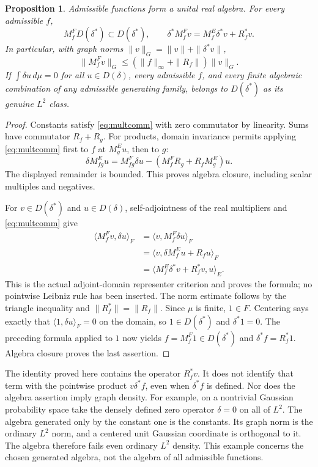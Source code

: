 \documentclass[11pt]{article}
\newtheorem{proposition}[theorem]{Proposition}
\begin{document}
\begin{proposition}\label{prop:multadjoint}
Admissible functions form a unital real algebra. For every admissible $f$,
\[
 M_f^F D(\delta^*)\subset D(\delta^*),\qquad
 \delta^*M_f^Fv=M_f^E\delta^*v+R_f^*v.
\]
In particular, with graph norms $\|v\|_G=\|v\|+\|\delta^*v\|$,
\[
 \|M_f^Fv\|_G\leq
 (\|f\|_\infty+\|R_f\|)\|v\|_G.
\]
If $\int\delta u\,d\mu=0$ for all $u\in D(\delta)$, every
admissible $f$, and every finite algebraic combination of any admissible
generating family, belongs to $D(\delta^*)$ as its genuine $L^2$ class.
\end{proposition}
\begin{proof}
Constants satisfy \eqref{eq:multcomm} with zero commutator by linearity.
Sums have commutator $R_f+R_g$. For products, domain invariance permits
applying \eqref{eq:multcomm} first to $f$ at $M_g^Eu$, then to $g$:
\[
 \delta M_{fg}^Eu=M_{fg}^F\delta u
       -(M_f^FR_g+R_fM_g^E)u.
\]
The displayed remainder is bounded. This proves algebra closure,
including scalar multiples and negatives.

For $v\in D(\delta^*)$ and $u\in D(\delta)$, self-adjointness of
the real multipliers and \eqref{eq:multcomm} give
\begin{align*}
 \langle M_f^Fv,\delta u\rangle_F
 &=\langle v,M_f^F\delta u\rangle_F\\
 &=\langle v,\delta M_f^Eu+R_fu\rangle_F\\
 &=\langle M_f^E\delta^*v+R_f^*v,u\rangle_E.
\end{align*}
This is the actual adjoint-domain representer criterion and proves
the formula; no pointwise Leibniz rule has been inserted.
The norm estimate follows by the triangle inequality and
$\|R_f^*\|=\|R_f\|$.
Since $\mu$ is finite, $1\in F$. Centering says exactly that
$\langle1,\delta u\rangle_F=0$ on the domain, so
$1\in D(\delta^*)$ and $\delta^*1=0$. The preceding formula applied
to $1$ now yields $f=M_f^F1\in D(\delta^*)$ and
$\delta^*f=R_f^*1$. Algebra closure proves the last assertion.
\end{proof}

The identity proved here contains the operator $R_f^*v$.
It does not identify that term with the pointwise product
$v\delta^*f$, even when $\delta^*f$ is defined. Nor does the algebra
assertion imply graph density. For example, on a nontrivial Gaussian
probability space take the densely defined zero operator $\delta=0$
on all of $L^2$. The algebra generated only by the constant one is
the constants. Its graph norm is the ordinary $L^2$ norm, and a centered
unit Gaussian coordinate is orthogonal to it. The algebra therefore
fails even ordinary $L^2$ density. This example concerns the chosen
generated algebra, not the algebra of all admissible functions.
\end{document}
